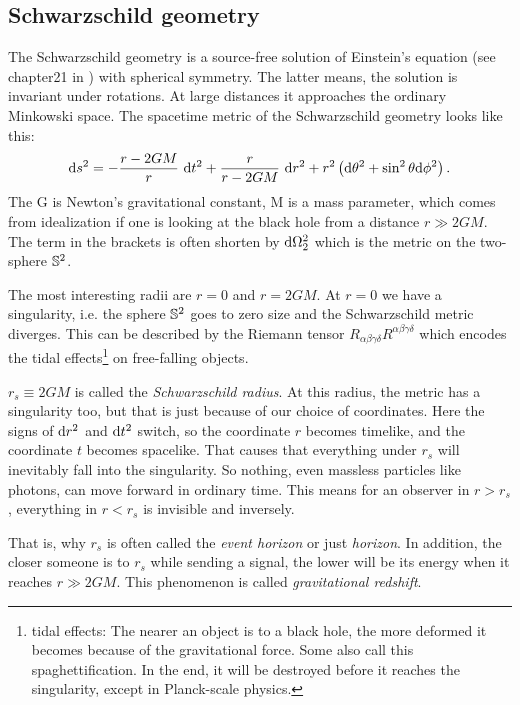 \subsection{Schwarzschild geometry \checkmark}
	
	The Schwarzschild geometry is a source-free solution of Einstein's equation (see chapter21 in \cite{ARTfliesbach}) with spherical symmetry. The latter means, the solution is invariant under rotations. 
	At large distances it approaches the ordinary Minkowski space.
	The spacetime metric of the Schwarzschild geometry looks like this:\\
		\begin{equation} \label{p.3 (2.1)}
		\mathrm{d} s^2=-\frac{r-2GM}{r}~ \mathrm{d} t^2+\frac{r}{r-2GM}~
		\mathrm{d} r^2+r^2 \left( \mathrm{d} \theta^2+\sin^2\theta \mathrm{d} \phi^2 \right).
		\end{equation}
	The G is Newton's gravitational constant, M is a mass parameter, which comes from idealization if one is looking at the black hole from a distance $r\gg 2GM$.
	The term in the brackets is often shorten by $\mathrm{d} \Omega_2^2$ which is the metric on the two-sphere $\mathbb{S}^2$.
	
	The most interesting radii are $r=0$ and $r=2GM$.
	At $r=0$ we have a singularity, i.e. the sphere $\mathbb{S}^2$ goes to zero size and the Schwarzschild metric diverges.
	This can be described by the Riemann tensor $R_{\alpha\beta\gamma \delta}R^{\alpha\beta\gamma\delta}$ which encodes the tidal effects\footnote{tidal effects: The nearer an object is to a black hole, the more deformed it becomes because of the gravitational force. Some also call this spaghettification. In the end, it will be destroyed before it reaches the singularity, except in Planck-scale physics.} on free-falling objects.
	
	$r_{s}\equiv 2GM$ is called the \textit{Schwarzschild radius}. At this radius, the metric has a singularity too, but that is just because of our choice of coordinates. Here the signs of $\mathrm{d} r^2$ and $\mathrm{d} t^2$ switch, so the coordinate $r$ becomes timelike, and the coordinate $t$ becomes spacelike. That causes that everything under $r_{s}$ will inevitably fall into the singularity. 
	So nothing, even massless particles like photons, can move forward in ordinary time. This means for an observer in $r>r_{s}$, everything in $r<r_{s}$ is invisible and inversely. 
	
	That is, why $r_{s}$ is often called the \textit{event horizon} or just \textit{horizon}.
	In addition, the closer someone is to $r_{s}$ while sending a signal, the lower will be its energy when it reaches $r\gg 2GM$. This phenomenon is called \textit{gravitational redshift}.

